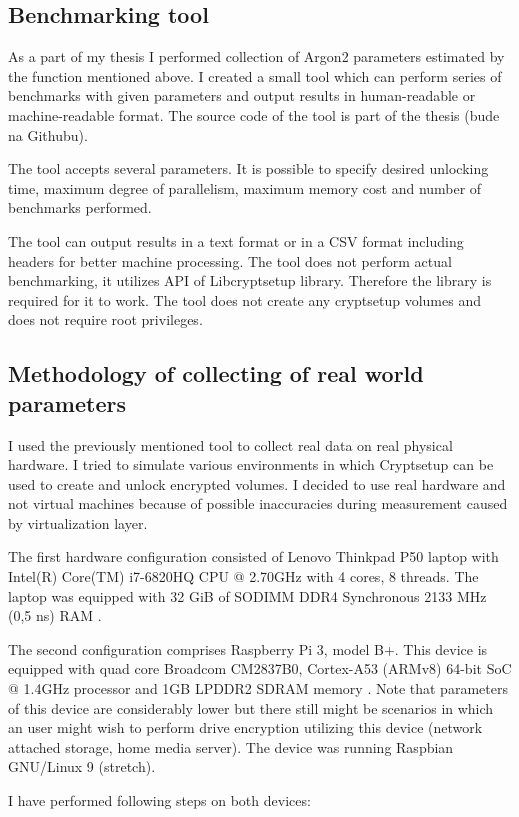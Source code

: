 \documentclass[nolof]{fithesis3}
\begin{document}
\subsection{Benchmarking tool}
As a part of my thesis I performed collection of Argon2 parameters estimated by the function mentioned above. I created a small tool which can perform series of benchmarks with given parameters and output results in human-readable or machine-readable format. The source code of the tool is part of the thesis (bude na Githubu).

The tool accepts several parameters. It is possible to specify desired unlocking time, maximum degree of parallelism, maximum memory cost and number of benchmarks performed.

The tool can output results in a text format or in a CSV format including headers for better machine processing. The tool does not perform actual benchmarking, it utilizes API of Libcryptsetup library. Therefore the library is required for it to work. The tool does not create any cryptsetup volumes and does not require root privileges.

\subsection{Methodology of collecting of real world parameters}
I used the previously mentioned tool to collect real data on real physical hardware. I tried to simulate various environments in which Cryptsetup can be used to create and unlock encrypted volumes. I decided to use real hardware and not virtual machines because of possible inaccuracies during measurement caused by virtualization layer.

The first hardware configuration consisted of Lenovo Thinkpad P50 laptop with Intel(R) Core(TM) i7-6820HQ CPU @ 2.70GHz with 4 cores, 8 threads. The laptop was equipped with 32 GiB of SODIMM DDR4 Synchronous 2133 MHz (0,5 ns) RAM \parencite{laptopspecs}.

The second configuration comprises Raspberry Pi 3, model B+. This device is equipped with quad core Broadcom CM2837B0, Cortex-A53 (ARMv8) 64-bit SoC @ 1.4GHz processor and 1GB LPDDR2 SDRAM memory \parencite{raspberryspecs}. Note that parameters of this device are considerably lower but there still might be scenarios in which an user might wish to perform drive encryption utilizing this device (network attached storage, home media server). The device was running Raspbian GNU/Linux 9 (stretch).

I have performed following steps on both devices:
\end{document}
